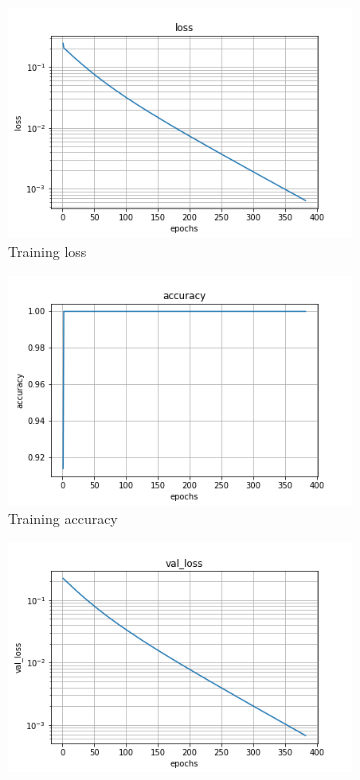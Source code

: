 \documentclass{article}
\begin{document}
\begin{figure}
\centering
\begin{subfigure}[b]{0.45\textwidth}
    \centering
    \includegraphics[totalheight=4cm]{circle_id/binary_plotloss.png}
    \caption{Training loss}
  \end{subfigure}
%
\begin{subfigure}[b]{0.45\textwidth}
    \centering
    \includegraphics[totalheight=4cm]{circle_id/binary_plotaccuracy.png}
    \caption{Training accuracy}
  \end{subfigure}
%
\begin{subfigure}[b]{0.45\textwidth}
    \centering
    \includegraphics[totalheight=4cm]{circle_id/binary_plotval_loss.png}

\end{subfigure}
\end{figure}
\end{document}
